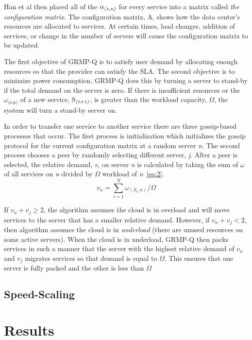 \documentclass{sig-alternate}
\begin{document}
Han et al then placed all of the \emph{$\alpha_\emph{(s,n)}$} for every service into a matrix called \emph{the configuration matrix}. The configuration matrix, A, shows how the data center's resources are allocated to services. At certain times, load changes, addition of services, or change in the number of servers will cause the configuration matrix to be updated. 

The first objective of GRMP-Q is to satisfy user demand by allocating enough resources so that the provider can satisfy the SLA. The second objective is to minimize power consumption. GRMP-Q does this by turning a server to stand-by if the total demand on the server is zero. If there is insufficient resources or the \emph{$\omega_{\text{(s,n)}}$} of a new service, S$_{\text{\emph{(i+1)}}}$, is greater than the workload capacity, $\Omega$, the system will turn a stand-by server on. 

In order to transfer one service to another service there are three gossip-based processes that occur. The first process is initialization which initializes the gossip protocol for the current configuration matrix at a random server \emph{n}.  The second process chooses a peer by randomly selecting different server, \emph{j}. After a peer is selected, the relative demand, \emph{v}, on server \emph{n} is calculated by taking the sum of \emph{$\omega$} of all services on \emph{n} divided by $\Omega$ workload of \emph{n}~\eqref{eq:2}.
\begin{equation}
v_n = \sum_{i=1}^N \omega_{(S_i,n)}/\Omega\label{eq:2}
\end{equation}

If $v_n + v_j \geq 2$, the algorithm assumes the cloud is in overload and will move services to the server that has a smaller relative demand. However, if $v_n + v_j < 2$, then algorithm assumes the cloud is in \emph{underload} (there are unused resources on some active servers). When the cloud is in underload, GRMP-Q then packs services in such a manner that the server with the highest relative demand of $v_n$ and $v_j$ migrates services so that demand is equal to $\Omega$. This ensures that one server is fully packed and the other is less than $\Omega$

\subsection{Speed-Scaling}
\label{sec:Speed}

\section{Results} 
\label{sec:results}
\end{document}
